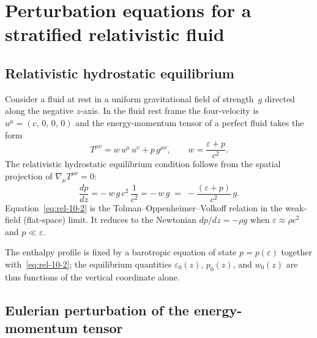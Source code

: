 \section{Perturbation equations for a stratified relativistic fluid}
\label{sec:rel-91}

\subsection{Relativistic hydrostatic equilibrium}
\label{sec:rel-91-equil}

Consider a fluid at rest in a uniform gravitational field of strength~$g$
directed along the negative $z$-axis.  In the fluid rest frame the
four-velocity is $u^{\mu} = (c,\,0,\,0,\,0)$ and the energy-momentum
tensor of a perfect fluid takes the form
\begin{equation}
\label{eq:rel-10-1}
T^{\mu\nu} = w\,u^{\mu}\,u^{\nu} + p\,g^{\mu\nu},
\qquad w = \frac{\varepsilon+p}{c^{2}}.
\end{equation}
The relativistic hydrostatic equilibrium condition follows from the
spatial projection of $\nabla_{\mu}T^{\mu\nu}=0$:
\begin{equation}
\label{eq:rel-10-2}
\frac{dp}{dz} = -\,w\,g\,c^{2}\,\frac{1}{c^{2}} = -\,w\,g
\;=\; -\frac{(\varepsilon+p)}{c^{2}}\,g.
\end{equation}
Equation~\eqref{eq:rel-10-2} is the Tolman--Oppenheimer--Volkoff
relation in the weak-field (flat-space) limit.  It reduces to the
Newtonian $dp/dz = -\rho g$ when $\varepsilon \approx \rho c^{2}$ and
$p \ll \varepsilon$.

The enthalpy profile is fixed by a barotropic equation of state
$p = p(\varepsilon)$ together with~\eqref{eq:rel-10-2}; the equilibrium
quantities $\varepsilon_{0}(z)$, $p_{0}(z)$, and $w_{0}(z)$ are thus
functions of the vertical coordinate alone.

\subsection{Eulerian perturbation of the energy-momentum tensor}
\label{sec:rel-91-pert}

